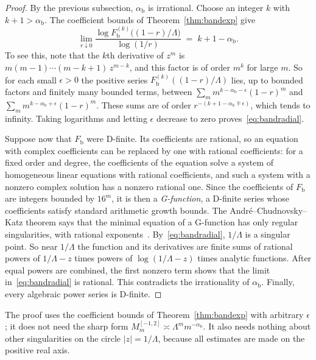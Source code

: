 \begin{proof}
By the previous subsection, $\alpha_{\mathrm b}$ is irrational. Choose an integer $k$ with
$k+1>\alpha_{\mathrm b}$. The coefficient bounds of Theorem~\ref{thm:bandexp} give
\begin{equation}\label{eq:bandradial}
\lim_{r\downarrow0}\frac{\log F_{\mathrm b}^{(k)}\big((1-r)/\Lambda\big)}{\log(1/r)}\;=\;k+1-\alpha_{\mathrm b} .
\end{equation}
To see this, note that the $k$th derivative of $z^m$ is ${m(m-1)\cdots(m-k+1)}\,z^{m-k}$, and this
factor is of order $m^k$ for large $m$. So for each small $\epsilon>0$ the
positive series $F_{\mathrm b}^{(k)}((1-r)/\Lambda)$ lies, up to bounded factors and finitely many bounded
terms, between $\sum_m m^{k-\alpha_{\mathrm b}-\epsilon}(1-r)^m$ and $\sum_m m^{k-\alpha_{\mathrm b}+\epsilon}(1-r)^m$.
These sums are of order $r^{-(k+1-\alpha_{\mathrm b}\mp\epsilon)}$, which tends to infinity. Taking
logarithms and letting $\epsilon$ decrease to zero proves~\eqref{eq:bandradial}.

Suppose now that $F_{\mathrm b}$ were D-finite. Its coefficients are rational, so an equation with
complex coefficients can be replaced by one with rational coefficients: for a fixed order and degree,
the coefficients of the equation solve a system of homogeneous linear equations with rational
coefficients, and such a system with a nonzero complex solution has a nonzero rational one. Since the
coefficients of $F_{\mathrm b}$ are integers bounded by $16^m$, it is then a \emph{G-function}, a D-finite
series whose coefficients satisfy standard arithmetic growth bounds. The Andr\'e--Chudnovsky--Katz
theorem says that the minimal equation of a G-function has only regular singularities, with rational
exponents~\cite[Theorem~6]{FischlerRivoal2014}. By~\eqref{eq:bandradial}, $1/\Lambda$ is a singular point.
So near $1/\Lambda$ the function and its derivatives are finite sums of rational powers of $1/\Lambda-z$
times powers of $\log(1/\Lambda-z)$ times analytic functions. After equal powers are combined, the
first nonzero term shows that the limit in~\eqref{eq:bandradial} is rational. This contradicts the
irrationality of $\alpha_{\mathrm b}$. Finally, every algebraic power series is D-finite.
\end{proof}

The proof uses the coefficient bounds of Theorem~\ref{thm:bandexp} with arbitrary $\epsilon$; it does not
need the sharp form $M^{[-1,2]}_m\asymp\Lambda^mm^{-\alpha_{\mathrm b}}$. It also needs nothing about other
singularities on the circle $|z|=1/\Lambda$, because all estimates are made on the positive real axis.

